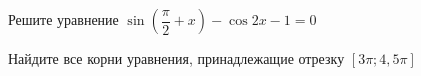 \begin{ex}
	\begin{condition}
		\begin{enumcols}[label=\asbuk*)]
			\item Решите уравнение \( \sin{\left(\dfrac{\pi}{2}+x\right)}  - \cos 2x - 1= 0 \)
			\item Найдите все корни уравнения, принадлежащие отрезку \(  \left[3\pi;4,5\pi\right] \)
		\end{enumcols}
	\end{condition}
\end{ex}